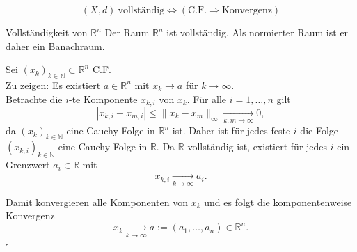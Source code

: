\begin{bemerkungbox}
    $$
    (X,d)\ \text{vollständig} \Longleftrightarrow (\text{C.F.}\Rightarrow \text{Konvergenz})
    $$
\end{bemerkungbox}

\begin{satz}{Vollständigkeit von $\mathbb{R}^n$}
    Der Raum $\mathbb{R}^n$ ist vollständig. Als normierter Raum ist er daher ein Banachraum.
\end{satz}

\begin{beweisbox}
    Sei $(x_k)_{k\in\mathbb{N}}\subset\mathbb{R}^n$ C.F.\\

    Zu zeigen: Es existiert $a\in\mathbb{R}^n$ mit $x_k\to a$ für $k\to\infty$.\\

    Betrachte die $i$-te Komponente $x_{k,i}$ von $x_k$. Für alle $i=1,\dots,n$ gilt
    $$
    |x_{k,i}-x_{m,i}|\leq\|x_k-x_m\|_\infty\xrightarrow[k,m\to\infty]{}0,
    $$
    da $(x_k)_{k\in\mathbb{N}}$ eine Cauchy-Folge in $\mathbb{R}^n$ ist. Daher ist für jedes feste $i$ die Folge $(x_{k,i})_{k\in\mathbb{N}}$ eine Cauchy-Folge in $\mathbb{R}$. Da $\mathbb{R}$ vollständig ist, existiert für jedes $i$ ein Grenzwert $a_i\in\mathbb{R}$ mit
    $$
    x_{k,i}\xrightarrow[k\to\infty]{}a_i.
    $$

    Damit konvergieren alle Komponenten von $x_k$ und es folgt die komponentenweise Konvergenz
    $$
    x_k\xrightarrow[k\to\infty]{}a:= (a_1,\dots,a_n)\in\mathbb{R}^n.
    $$
    \hfill $\square$   
\end{beweisbox}